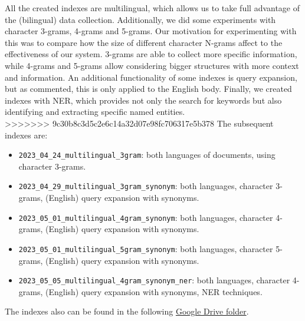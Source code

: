 All the created indexes are multilingual, which allows us to take full advantage of the (bilingual) data collection.
Additionally, we did some experiments with character 3-grams, 4-grams and 5-grams.
Our motivation for experimenting with this was to compare how the size of different character N-grams affect to the
effectiveness of our system.
3-grams are able to collect more specific information, while 4-grams and 5-grams allow considering bigger structures
with more context and information.
An additional functionality of some indexes is query expansion, but as commented, this is only applied to the English
body.
Finally, we created indexes with NER, which provides not only the search for keywords but also identifying and
extracting specific named entities.\\

>>>>>>> 9c30b8c3d5c2e6c14a32d07e98fc706317e5b378
The subsequent indexes are:
\begin{itemize}
	\item \texttt{2023\_04\_24\_multilingual\_3gram}: both languages of documents, using character 3-grams.
	\item \texttt{2023\_04\_29\_multilingual\_3gram\_synonym}: both languages, character 3-grams, (English) query expansion with synonyms.
	\item \texttt{2023\_05\_01\_multilingual\_4gram\_synonym}: both languages, character 4-grams, (English) query expansion with synonyms.
	\item \texttt{2023\_05\_01\_multilingual\_5gram\_synonym}: both languages, character 5-grams, (English) query expansion with synonyms.
	\item \texttt{2023\_05\_05\_multilingual\_4gram\_synonym\_ner}: both languages, character 4-grams, (English) query expansion with synonyms, NER techniques.
\end{itemize}

The indexes also can be found in the following
\href{https://drive.google.com/drive/folders/1CK_kLeZ5Us3VJe8hiG1vhwPrDs94cLvU?usp=share_link}{Google Drive folder}.\\

